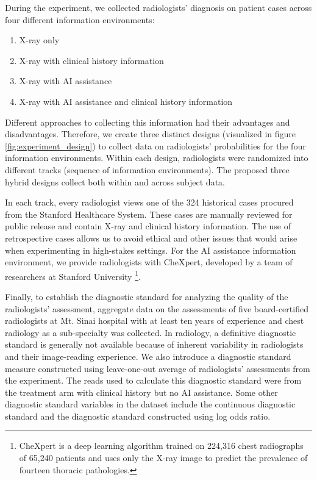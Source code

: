 \documentclass[fleqn,10pt]{wlscirep}
\begin{document}
During the experiment, we collected radiologists' diagnosis on patient cases across four different information environments:

\begin{enumerate}
    \item X-ray only
    \item X-ray with clinical history information
    \item X-ray with AI assistance 
    \item X-ray with AI assistance and clinical history information
\end{enumerate}

Different approaches to collecting this information had their advantages and disadvantages. Therefore, we create three distinct designs (visualized in figure \ref{fig:experiment_design}) to collect data on radiologists’ probabilities for the four information environments. Within each design, radiologists were randomized into different tracks (sequence of information environments). The proposed three hybrid designs collect both within and across subject data.

In each track, every radiologist views one of the 324 historical cases procured from the Stanford Healthcare System. These cases are manually reviewed for public release and contain X-ray and clinical history information. The use of retrospective cases allows us to avoid ethical and other issues that would arise when experimenting in high-stakes settings. For the AI assistance information environment, we provide radiologists with CheXpert, developed by a team of researchers at Stanford University \footnote{CheXpert is a deep learning algorithm trained on 224,316 chest radiographs of 65,240 patients and uses only the X-ray image to predict the prevalence of fourteen thoracic pathologies.}.

Finally, to establish the diagnostic standard for analyzing the quality of the radiologists' assessment, aggregate data on the assessments of five board-certified radiologists at Mt. Sinai hospital with at least ten years of experience and chest radiology as a sub-specialty was collected. In radiology, a definitive diagnostic standard is generally not available because of inherent variability in radiologists and their image-reading experience. We also introduce a diagnostic standard measure constructed using leave-one-out average of radiologists' assessments from the experiment. The reads used to calculate this diagnostic standard were from the treatment arm with clinical history but no AI assistance. Some other diagnostic standard variables in the dataset include the continuous diagnostic standard and the diagnostic standard constructed using log odds ratio. 
\end{document}
